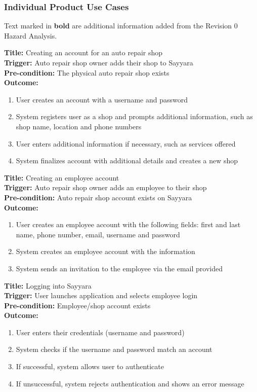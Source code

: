 \documentclass[12pt]{article}
\begin{document}
\subsubsection{Individual Product Use Cases}
Text marked in \textbf{bold} are additional information added from the Revision 0 Hazard Analysis.

\textbf{Title:} Creating an account for an auto repair shop\\
\textbf{Trigger:} Auto repair shop owner adds their shop to Sayyara\\
\textbf{Pre-condition:} The physical auto repair shop exists\\
\textbf{Outcome:}
\begin{enumerate}
	\item User creates an account with a username and password
	\item System registers user as a shop and prompts additional information, such as shop name, location and
	      phone numbers
	\item User enters additional information if necessary, such as services offered
	\item System finalizes account with additional details and creates a new shop
\end{enumerate}

\textbf{Title:} Creating an employee account\\
\textbf{Trigger:} Auto repair shop owner adds an employee to their shop\\
\textbf{Pre-condition:} Auto repair shop account exists on Sayyara\\
\textbf{Outcome:}
\begin{enumerate}
	\item User creates an employee account with the following fields: first and last name, phone number,
	      email, username and password
	\item System creates an employee account with the information
	\item System sends an invitation to the employee via the email provided
\end{enumerate}

\textbf{Title:} Logging into Sayyara\\
\textbf{Trigger:} User launches application and selects employee login\\
\textbf{Pre-condition:} Employee/shop account exists\\
\textbf{Outcome:}
\begin{enumerate}
	\item User enters their credentials (username and password)
	\item System checks if the username and password match an account
	\item If successful, system allows user to authenticate
	\item If unsuccessful, system rejects authentication and shows an error message
\end{enumerate}
\end{document}
